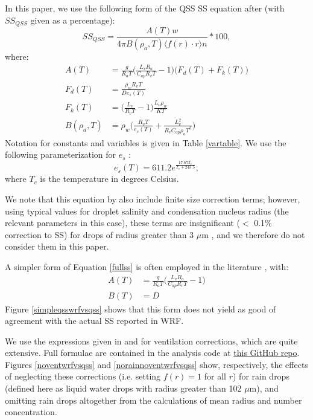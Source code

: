\documentclass{article}
\begin{document}
In this paper, we use the following form of the QSS SS equation after \cite{Rogers1989} (with $SS_{QSS}$ given as a percentage):
\begin{equation}
\label{fullss}
SS_{QSS} = \frac{A(T) w}{4\pi B(\rho_a, T) \langle f(r)\cdot r\rangle n}*100,
\end{equation}
where:
\begin{align}
A(T) &= \frac{g}{R_a T}\Big(\frac{L_v R_a}{C_{ap} R_v T} - 1\Big)\big(F_d(T) + F_k(T)\big)\nonumber\\
F_d(T) &= \frac{\rho_w R_v T}{D e_s(T)}\nonumber\\
F_k(T) &= \Big(\frac{L_v}{R_v T} - 1\Big)\frac{L_v \rho_w}{K T}\nonumber\\
B(\rho_a, T) &= \rho_w\Big(\frac{R_v T}{e_s(T)} + \frac{L_v^2}{R_v C_{ap} \rho_a T^2}\Big)
\end{align}
Notation for constants and variables is given in Table \ref{vartable}. We use the following parameterization for $e_s$ \cite{Rogers1989}:
\begin{equation}
e_s(T) = 611.2e^{\frac{17.67T_c}{T_c + 243.5}},
\end{equation}
where $T_c$ is the temperature in degrees Celsius.

We note that this equation by also include finite size correction terms; however, using typical values for droplet salinity and condensation nucleus radius (the relevant parameters in this case), these terms are insignificant ($<$ 0.1\% correction to SS) for drops of radius greater than 3 $\mu$m \cite{Rogers1989}, and we therefore do not consider them in this paper.

A simpler form of Equation \ref{fullss} is often employed in the literature \cite{Grabowski2020, Rogers1989}, with:
\begin{align}
A(T) &= \frac{g}{R_a T}\Big(\frac{L_v R_a}{C_{ap} R_v T} - 1\Big)\nonumber\\
B(T) &= D
\end{align}
Figure \ref{simpleqsswrfvsqss} shows that this form does not yield as good of agreement with the actual SS reported in WRF.

We use the expressions given in \cite{Pruppacher2010} and \cite{Rogers1989} for ventilation corrections, which are quite extensive. Full formulae are contained in the analysis code at \href{https://github.com/kt-latimer/20supersat}{this GitHub repo}. Figures \ref{noventwrfvsqss} and \ref{norainnoventwrfvsqss} show, respectively, the effects of neglecting these corrections (i.e. setting $f(r)=1$ for all $r$) for rain drops (defined here as liquid water drops with radius greater than 102 $\mu$m), and omitting rain drops altogether from the calculations of mean radius and number concentration.
\end{document}
